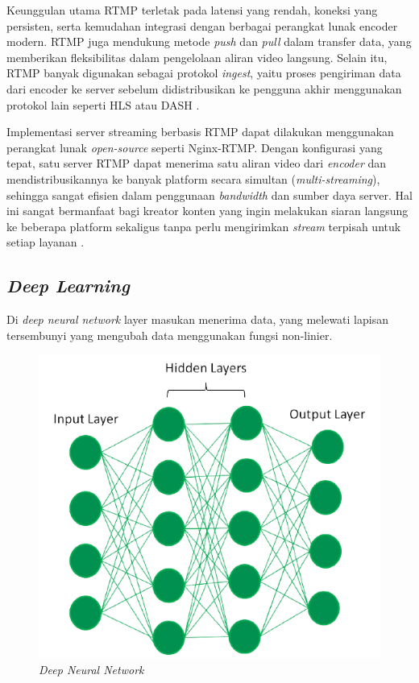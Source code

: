 Keunggulan utama RTMP terletak pada latensi yang rendah, koneksi yang persisten, serta kemudahan integrasi dengan berbagai perangkat lunak encoder modern. RTMP juga mendukung metode \emph{push} dan \emph{pull} dalam transfer data, yang memberikan fleksibilitas dalam pengelolaan aliran video langsung. Selain itu, RTMP banyak digunakan sebagai protokol \emph{ingest}, yaitu proses pengiriman data dari encoder ke server sebelum didistribusikan ke pengguna akhir menggunakan protokol lain seperti HLS atau DASH \cite{dyte2023rtmp}.

Implementasi server streaming berbasis RTMP dapat dilakukan menggunakan perangkat lunak \emph{open-source} seperti Nginx-RTMP. Dengan konfigurasi yang tepat, satu server RTMP dapat menerima satu aliran video dari \emph{encoder} dan mendistribusikannya ke banyak platform secara simultan (\emph{multi-streaming}), sehingga sangat efisien dalam penggunaan \emph{bandwidth} dan sumber daya server. Hal ini sangat bermanfaat bagi kreator konten yang ingin melakukan siaran langsung ke beberapa platform sekaligus tanpa perlu mengirimkan \emph{stream} terpisah untuk setiap layanan \cite{linode2021rtmp}.

\subsection{\emph{Deep Learning}}
Di \emph{deep neural network} layer masukan menerima data, yang melewati lapisan tersembunyi yang mengubah data menggunakan fungsi non-linier. 

\begin{figure} [H] \centering
  \includegraphics[scale=0.5]{bab2/deeplearning.png}
  \caption{\emph{Deep Neural Network} \cite{deeplearningimg}}
  \label{fig:neuralnetwork}
\end{figure}

